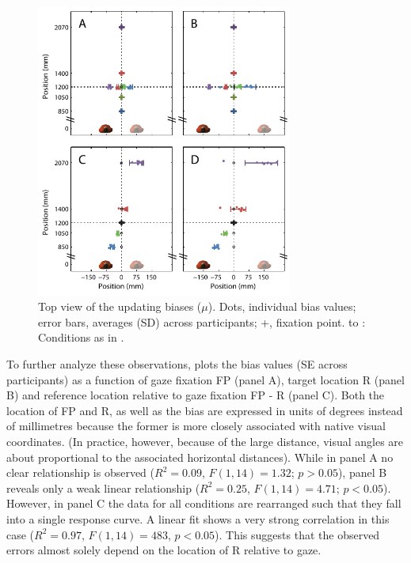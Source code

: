 \begin{figure}
    \includegraphics[width=0.75\textwidth]{src/paper2/figure3.pdf}
    
    \caption{Top view of the updating biases ($\mu$). Dots, individual bias values; error bars, averages (\textpm SD) across participants; +, fixation point.  to : Conditions as in .}
    
    \label{p2:fig3}
\end{figure}

To further analyze these observations,  plots the bias values ({\textpm}SE across participants) as a function of gaze fixation FP (panel A), target location R (panel B) and reference location relative to gaze fixation FP - R (panel C). Both the location of FP and R, as well as the bias are expressed in units of degrees instead of millimetres because the former is more closely associated with native visual coordinates. (In practice, however, because of the large distance, visual angles are about proportional to the associated horizontal distances). While in panel A no clear relationship is observed ($R^2 = 0.09$, $F(1,14) = 1.32$; $p > 0.05$), panel B reveals only a weak linear relationship ($R^2 = 0.25$, $F(1,14) = 4.71$; $p < 0.05$). However, in panel C the data for all conditions are rearranged such that they fall into a single response curve. A linear fit shows a very strong correlation in this case ($R^2 = 0.97$, $F(1,14) = 483$, $p < 0.05$). This suggests that the observed errors almost solely depend on the location of R relative to gaze.

